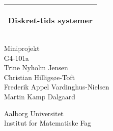 %
%
%
%
%
\begin{titlepage}
  \addtolength{\hoffset}{0.5\evensidemargin-0.5\oddsidemargin} %
  \noindent%
  \begin{tabular}{@{}p{\textwidth}@{}}
    \toprule[2pt]
    \midrule
    \vspace{0.2cm}
    \begin{center}
    \Huge{\textbf{
      Diskret-tids systemer
    }}
    \end{center}
    \vspace{0.2cm}\\
    \midrule
    \toprule[2pt]
  \end{tabular}
  \begin{center}
    {\large
      Miniprojekt
    }\\
    \vspace{0.2cm}
    {\Large
      G4-101a \\
      Trine Nyholm Jensen \\
      Christian Hilligsøe-Toft \\
      Frederik Appel Vardinghus-Nielsen \\
      Martin Kamp Dalgaard
    }
  \end{center}
  
  \begin{center}
  	Aalborg Universitet \\
	Institut for Matematiske Fag \\
  \end{center}
\end{titlepage}
\clearpage
